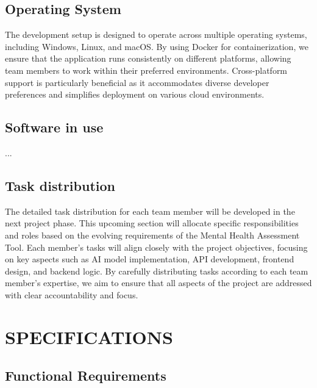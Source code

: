 \documentclass[conference]{IEEEtran}
\begin{document}
    \subsection {Operating System}

    The development setup is designed to operate across multiple 
    operating systems, including Windows, Linux, and macOS. 
    By using Docker for containerization, we ensure that the 
    application runs consistently on different platforms, 
    allowing team members to work within their preferred 
    environments. Cross-platform support is particularly beneficial 
    as it accommodates diverse developer preferences and simplifies 
    deployment on various cloud environments.
    \newline


    \subsection {Software in use}

...
    \newline

    \subsection {Task distribution}

    The detailed task distribution for each team member will be 
    developed in the next project phase. This upcoming section 
    will allocate specific responsibilities and roles based 
    on the evolving requirements of the Mental Health Assessment 
    Tool. Each member’s tasks will align closely with the project 
    objectives, focusing on key aspects such as AI model 
    implementation, API development, frontend design, and backend 
    logic. By carefully distributing tasks according to each team 
    member’s expertise, we aim to ensure that all aspects of the 
    project are addressed with clear accountability and focus.
    \newline

    \section{SPECIFICATIONS}


    \subsection {Functional Requirements}
   
\end{document}
